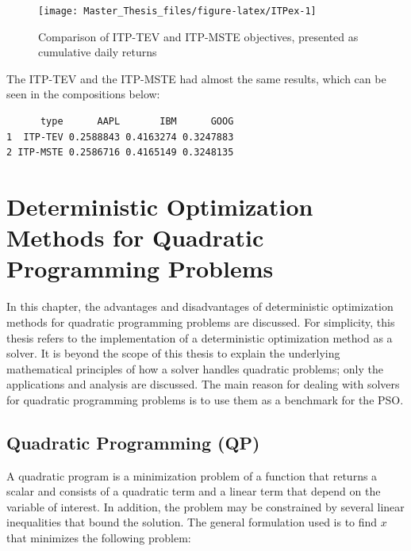 \documentclass[
  oneside, a4paper, 12pt, openany]{book}
\theoremstyle{definition}
\theoremstyle{definition}
\theoremstyle{definition}
\theoremstyle{definition}
\theoremstyle{remark}
\begin{document}
\begin{figure}[H]
\texttt{[image: Master\_Thesis\_files/figure-latex/ITPex-1]} \caption{Comparison of ITP-TEV and ITP-MSTE objectives, presented as cumulative daily returns}\label{fig:ITPex}
\end{figure}

The ITP-TEV and the ITP-MSTE had almost the same results, which can be seen in the compositions below:

\vspace{0.1cm}\fontsize{11}{12}\selectfont

\begin{verbatim}
      type      AAPL       IBM      GOOG
1  ITP-TEV 0.2588843 0.4163274 0.3247883
2 ITP-MSTE 0.2586716 0.4165149 0.3248135
\end{verbatim}

\normalsize\vspace{0.1cm}

\hypertarget{analyticalsolver}{%
\chapter{Deterministic Optimization Methods for Quadratic Programming Problems}\label{analyticalsolver}}


In this chapter, the advantages and disadvantages of deterministic optimization methods for quadratic programming problems are discussed. For simplicity, this thesis refers to the implementation of a deterministic optimization method as a solver. It is beyond the scope of this thesis to explain the underlying mathematical principles of how a solver handles quadratic problems; only the applications and analysis are discussed. The main reason for dealing with solvers for quadratic programming problems is to use them as a benchmark for the PSO.

\hypertarget{quadratic-programming-qp}{%
\section{Quadratic Programming (QP)}\label{quadratic-programming-qp}}

A quadratic program is a minimization problem of a function that returns a scalar and consists of a quadratic term and a linear term that depend on the variable of interest. In addition, the problem may be constrained by several linear inequalities that bound the solution. The general formulation used is to find \(x\) that minimizes the following problem:
\end{document}
